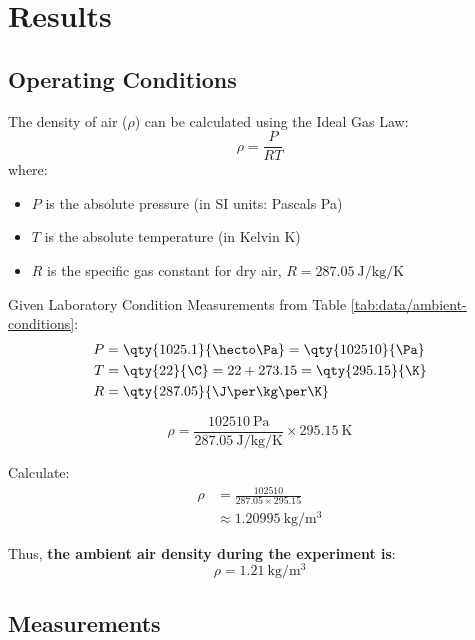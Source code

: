 \section{Results} \label{sec:results}

\subsection{Operating Conditions} \label{sec:results/conditions}

The density of air (\( \rho \)) can be calculated using the Ideal Gas Law:
\begin{equation}
    \rho = \frac{P}{R T}
\end{equation}
where:
\begin{itemize}
    \item \( P \) is the absolute pressure (in SI units: Pascals \unit{\Pa})
    \item \( T \) is the absolute temperature (in Kelvin \unit{\K})
    \item \( R \) is the specific gas constant for dry air, \( R = \qty{287.05}{\J\per\kg\per\K} \)
\end{itemize}

Given Laboratory Condition Measurements from Table \ref{tab:data/ambient-conditions}:
\begin{align}
    P &= \qty{1025.1}{\hecto\Pa} = \qty{102510}{\Pa} \\
    T &= \qty{22}{\C} = 22 + 273.15 = \qty{295.15}{\K} \\
    R &= \qty{287.05}{\J\per\kg\per\K}
\end{align}

\begin{equation}
    \rho = \frac{\qty{102510}{\Pa}}{\qty{287.05}{\J\per\kg\per\K}} \times \qty{295.15}{\K}
\end{equation}

Calculate:
\begin{align}
    \rho &= \frac{102510}{287.05 \times 295.15} \\
         &\approx \qty{1.20995}{\kg\per\m\cubed}
\end{align}

Thus, \textbf{the ambient air density during the experiment is}:
\begin{equation}
    \boxed{\rho = \qty{1.21}{\kg\per\m\cubed}}
\end{equation}

\subsection{Measurements} \label{sec:results/measurements}

